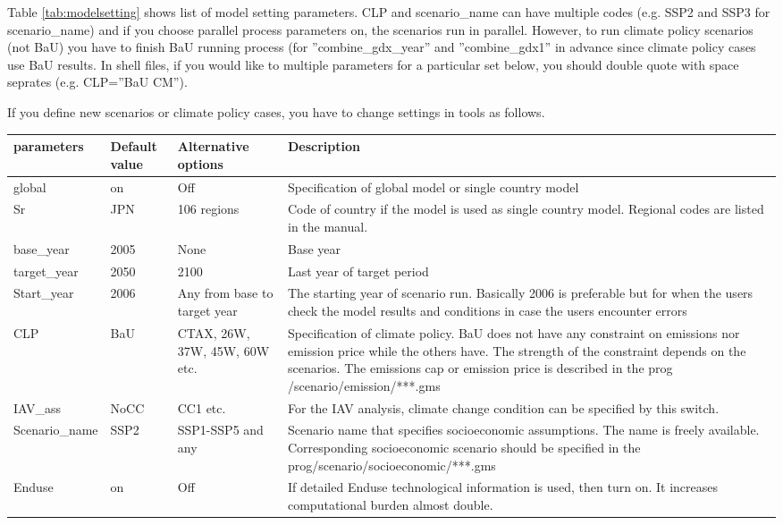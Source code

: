 \documentclass[10pt,a4paper,titlepage,dvipdfmx]{book}
\begin{document}
Table \ref{tab:modelsetting} shows list of model setting parameters. CLP and scenario\_name can have multiple codes (e.g. SSP2 and SSP3 for scenario\_name) and if you choose parallel process parameters on, the scenarios run in parallel. However, to run climate policy scenarios (not BaU) you have to finish BaU running process (for ''combine\_gdx\_year'' and ''combine\_gdx1'' in advance since climate policy cases use BaU results. In shell files, if you would like to multiple parameters for a particular set below, you should double quote with space seprates (e.g. CLP=''BaU CM'').

If you define new scenarios or climate policy cases, you have to change settings in tools as follows.


\begin{tabularx}{\textwidth}{|
p{}|
p{}|
p{}|
p{}|} 
\caption{model setting parameters\label{tab:modelsetting}} \\
\hline 
parameters & Default value & Alternative options & Description \\\hline 
global & on & Off & Specification of global model or single country model \\\hline 
Sr & JPN & 106 regions & Code of country if the model is used as single country model. Regional codes are listed in the manual. \\\hline 
base\_year & 2005 & None & Base year \\\hline 
target\_year & 2050 & 2100 & Last year of target period \\\hline 
Start\_year & 2006 & Any from base to target year & The starting year of scenario run. Basically 2006 is preferable but for when the users check the model results and conditions in case the users encounter errors \\\hline 
CLP & BaU & CTAX, 26W, 37W, 45W, 60W etc. & Specification of climate policy. BaU does not have any constraint on emissions nor emission price while the others have. The strength of the constraint depends on the scenarios. The emissions cap or emission price is described in the prog /scenario/emission/***.gms \\\hline 
IAV\_ass & NoCC & CC1 etc. & For the IAV analysis, climate change condition can be specified by this switch. \\\hline 
Scenario\_name & SSP2 & SSP1-SSP5 and any & Scenario name that specifies socioeconomic assumptions. The name is freely available. Corresponding socioeconomic scenario should be specified in the prog/scenario/socioeconomic/***.gms  \\\hline 
Enduse & on & Off & If detailed Enduse technological information is used, then turn on. It increases computational burden almost double. \\\hline 
\end{tabularx}
\end{document}
